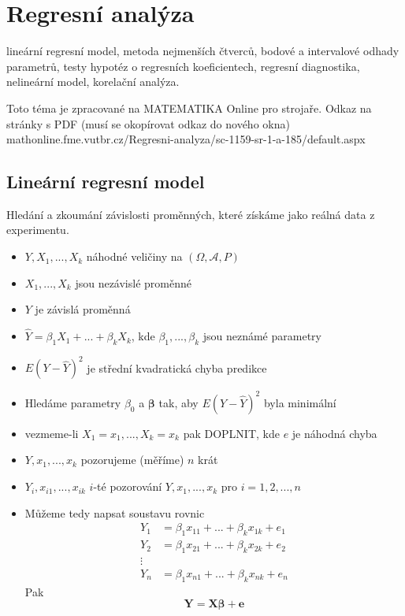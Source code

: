 \newpage
\section{Regresní analýza}



lineární regresní model, metoda nejmenších čtverců, bodové a intervalové odhady parametrů, testy hypotéz o regresních koeficientech, regresní diagnostika, nelineární model, korelační analýza.

Toto téma je zpracované na MATEMATIKA Online pro strojaře. Odkaz na stránky s PDF (musí se okopírovat odkaz do nového okna) mathonline.fme.vutbr.cz/Regresni-analyza/sc-1159-sr-1-a-185/default.aspx

\subsection{Lineární regresní model}
Hledání a zkoumání závislosti proměnných, které získáme jako reálná data z experimentu.

\begin{itemize}
    \item $Y, X_1,..., X_k$ náhodné veličiny na $(\Omega, \pmb{\mathcal{A}}, P)$
    \item $X_1,..., X_k$ jsou nezávislé proměnné
    \item $Y$ je závislá proměnná
    \item $\hat{Y} = \beta_1 X_1 + ... + \beta_k X_k$, kde $\beta_1, ..., \beta_k$ jsou neznámé parametry
    \item $E (Y - \hat{Y})^{2}$ je střední kvadratická chyba predikce
    \item Hledáme parametry $\beta_0$ a $\pmb{\beta}$ tak, aby $E (Y - \hat{Y})^{2}$ byla minimální 
    \item vezmeme-li $X_1 = x_1, ..., X_k = x_k$ pak    DOPLNIT, kde $e$ je náhodná chyba
    \item $Y, x_1,..., x_k$ pozorujeme (měříme) $n$ krát
    \item $Y_i, x_{i1},..., x_{ik}$ $i$-té pozorování $Y, x_1,..., x_k$ pro $i=1,2,...,n$
    \item Můžeme tedy napsat soustavu rovnic \begin{align*}
Y_1 &= \beta_1 x_{11} + ... + \beta_k x_{1k} + e_1 \\
    Y_2 &= \beta_1 x_{21} + ... + \beta_k x_{2k} + e_2 \\
    \vdots \\
    Y_n &= \beta_1 x_{n1} + ... + \beta_k x_{nk} + e_n    
\end{align*} 
    Pak $$\mathbf{Y} = \mathbf{X} \pmb{\beta} + \mathbf{e}$$ 
\end{itemize}

